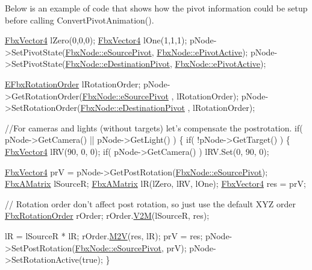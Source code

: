 Below is an example of code that shows how the pivot information could be setup before calling Convert\+Pivot\+Animation(). 
\begin{DoxyCode}
\hyperlink{class_fbx_vector4}{FbxVector4} lZero(0,0,0);
\hyperlink{class_fbx_vector4}{FbxVector4} lOne(1,1,1);
pNode->SetPivotState(\hyperlink{class_fbx_node_ae62b7311ac4727654cdf1ebd5cbf7343ae8ed37a5c7e41f8d1cec9d3fa8424b69}{FbxNode::eSourcePivot}, 
      \hyperlink{class_fbx_node_a153fc75958227fc6728a2233b630b58aa3e58a6a13e3ace7a8df4e10d38e830ad}{FbxNode::ePivotActive});
pNode->SetPivotState(\hyperlink{class_fbx_node_ae62b7311ac4727654cdf1ebd5cbf7343a9822ce03ebfd64b85ca6a570201eb3cc}{FbxNode::eDestinationPivot}, 
      \hyperlink{class_fbx_node_a153fc75958227fc6728a2233b630b58aa3e58a6a13e3ace7a8df4e10d38e830ad}{FbxNode::ePivotActive});

\hyperlink{fbxmath_8h_ae46778666b56bb0abe5992b855fe9332}{EFbxRotationOrder} lRotationOrder;
pNode->GetRotationOrder(\hyperlink{class_fbx_node_ae62b7311ac4727654cdf1ebd5cbf7343ae8ed37a5c7e41f8d1cec9d3fa8424b69}{FbxNode::eSourcePivot} , lRotationOrder);
pNode->SetRotationOrder(\hyperlink{class_fbx_node_ae62b7311ac4727654cdf1ebd5cbf7343a9822ce03ebfd64b85ca6a570201eb3cc}{FbxNode::eDestinationPivot} , lRotationOrder);

\textcolor{comment}{//For cameras and lights (without targets) let's compensate the postrotation.}
\textcolor{keywordflow}{if}( pNode->GetCamera() || pNode->GetLight() )
\{
   \textcolor{keywordflow}{if}( !pNode->GetTarget() )
   \{
       \hyperlink{class_fbx_vector4}{FbxVector4} lRV(90, 0, 0);
       \textcolor{keywordflow}{if}( pNode->GetCamera() )
          lRV.Set(0, 90, 0);

       \hyperlink{class_fbx_vector4}{FbxVector4} prV = pNode->GetPostRotation(\hyperlink{class_fbx_node_ae62b7311ac4727654cdf1ebd5cbf7343ae8ed37a5c7e41f8d1cec9d3fa8424b69}{FbxNode::eSourcePivot});
       \hyperlink{class_fbx_a_matrix}{FbxAMatrix} lSourceR;
       \hyperlink{class_fbx_a_matrix}{FbxAMatrix} lR(lZero, lRV, lOne);
       \hyperlink{class_fbx_vector4}{FbxVector4} res = prV;

       \textcolor{comment}{// Rotation order don't affect post rotation, so just use the default XYZ order}
       \hyperlink{class_fbx_rotation_order}{FbxRotationOrder} rOrder;
       rOrder.\hyperlink{class_fbx_rotation_order_a51aaffe701607ad3ce75f153f8ff1965}{V2M}(lSourceR, res);

       lR = lSourceR * lR;
       rOrder.\hyperlink{class_fbx_rotation_order_af1f1258fdb975cc35fc38456d6f8ba7c}{M2V}(res, lR);
       prV = res;
       pNode->SetPostRotation(\hyperlink{class_fbx_node_ae62b7311ac4727654cdf1ebd5cbf7343ae8ed37a5c7e41f8d1cec9d3fa8424b69}{FbxNode::eSourcePivot}, prV);
       pNode->SetRotationActive(\textcolor{keyword}{true});
   \}


\end{DoxyCode}
